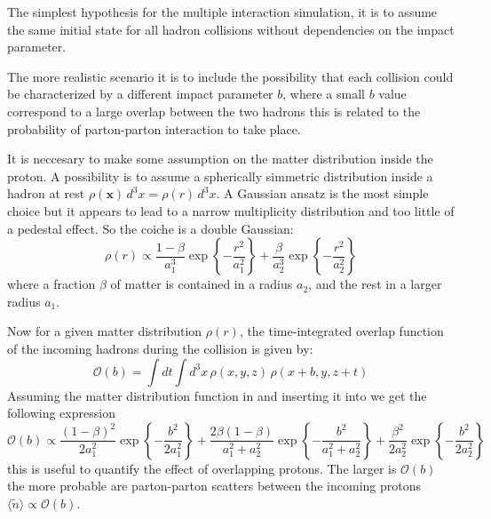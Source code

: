The simplest hypothesis for the multiple interaction simulation, it is to assume the same initial state for all hadron collisions without dependencies on the impact parameter. 

The more realistic scenario it is to include the possibility that each collision could be characterized by a different impact parameter $b$, where a small $b$ value correspond to a large overlap between the two hadrons this is related to the probability of parton-parton interaction to take place.

It is neccesary to make some assumption on the matter distribution inside the proton. A possibility is to assume a spherically simmetric distribution inside a hadron at rest $\rho(\mathbf{x})\,d^3x=\rho(r)\,d^3x$. A Gaussian ansatz is the most simple choice but it appears to lead to a narrow multiplicity distribution and too little of a pedestal effect. So the coiche is a double Gaussian:
\begin{equation}
	\rho(r) \propto \frac{1-\beta}{a_1^3}\exp\left\{-\frac{r^2}{a_1^2}\right\}+\frac{\beta}{a_2^3}\exp\left\{ -\frac{r^2}{a_2^2} \right\}
	\label{eq:matterDistribution}
\end{equation}
where a fraction $\beta$ of matter is contained in a radius $a_2$, and the rest in a larger radius $a_1$.

\bigskip

Now for a given matter distribution $\rho(r)$,  the time-integrated overlap function of the incoming hadrons during the collision is given by:
\begin{equation}
	\mathcal{O}(b)=\displaystyle\int dt \displaystyle\int d^3x\,\rho(x,y,z)\,\rho(x+b,y,z+t)
	\label{eq:overlappingFunction}
\end{equation} 
Assuming the matter distribution function in  and inserting it into  we get  the following expression
\begin{equation}
	\mathcal{O}(b)\propto \frac{(1-\beta)^2}{2a_1^2}\exp\left\{-\frac{b^2}{2a_1^2}\right\}+\frac{2\beta(1-\beta)}{a_1^2+a_2^2}\exp\left\{ -\frac{b^2}{a_1^2+a_2^2} \right\}+\frac{\beta^2}{2a_2^2}\exp\left\{-\frac{b^2}{2a_2^2}\right\}
\end{equation}
this is useful to quantify the effect of overlapping protons.
The larger is $\mathcal{O}(b)$ the more probable are parton-parton scatters between the incoming protons $\langle \widetilde{n} \rangle\propto \mathcal{O}(b)$.

\bigskip

